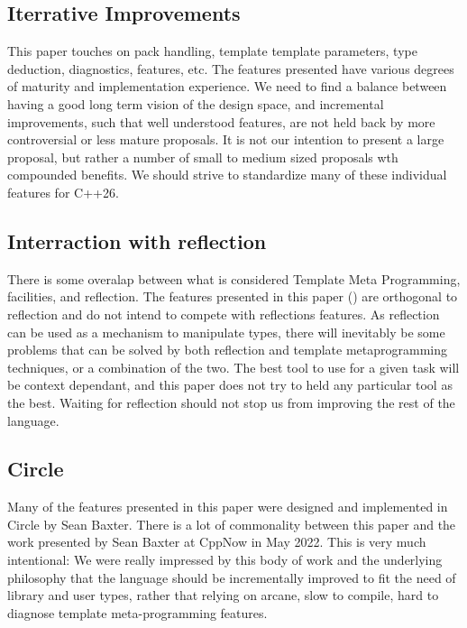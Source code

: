 \documentclass{wg21}
\begin{document}
\subsection{Iterrative Improvements}

This paper touches on pack handling, template template parameters, type deduction, diagnostics,  features, etc.
The features presented have various degrees of maturity and implementation experience.
We need to find a balance between having a good long term vision of the design space, and incremental improvements, such that well understood features,
are not held back by more controversial or less mature proposals.
It is not our intention to present a large proposal, but rather a number of small to medium sized proposals wth compounded benefits.
We should strive to standardize many of these individual features for C++26.

\subsection{Interraction with reflection}

There is some overalap between what is considered Template Meta Programming,  facilities, and reflection.
The features presented in this paper () are orthogonal to reflection and do not intend to compete with reflections
features.
As reflection can be used as a mechanism to manipulate types, there will inevitably be some problems that can be solved by both reflection
and template metaprogramming techniques, or a combination of the two. The best tool to use for a given task will be context dependant,
and this paper does not try to held any particular tool as the best.
Waiting for reflection should not stop us from improving the rest of the language.

\subsection{Circle}

Many of the features presented in this paper were designed and implemented in Circle by Sean Baxter.
There is a lot of commonality between this paper and the work presented by Sean Baxter at CppNow in May 2022.
This is very much intentional: We were really impressed by this body of work and the underlying philosophy that the language should be incrementally improved
to fit the need of library and user types, rather that relying on arcane, slow to compile, hard to diagnose template meta-programming features.
\end{document}

